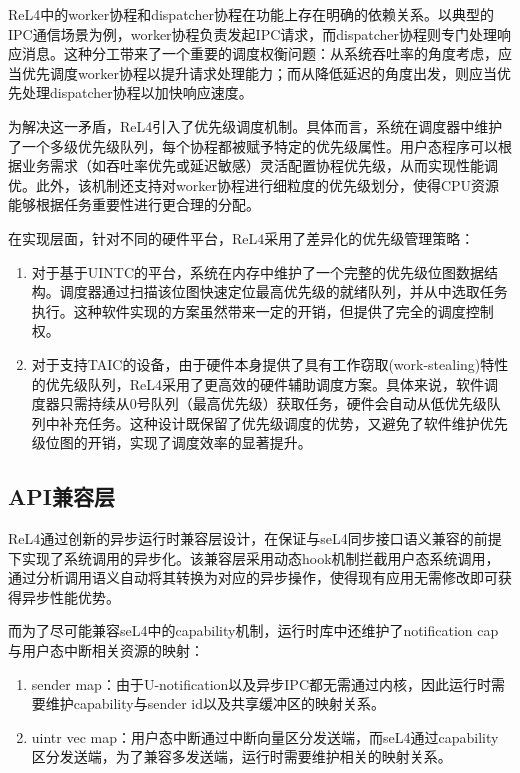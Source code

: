 ReL4中的worker协程和dispatcher协程在功能上存在明确的依赖关系。以典型的IPC通信场景为例，worker协程负责发起IPC请求，而dispatcher协程则专门处理响应消息。这种分工带来了一个重要的调度权衡问题：从系统吞吐率的角度考虑，应当优先调度worker协程以提升请求处理能力；而从降低延迟的角度出发，则应当优先处理dispatcher协程以加快响应速度。

为解决这一矛盾，ReL4引入了优先级调度机制。具体而言，系统在调度器中维护了一个多级优先级队列，每个协程都被赋予特定的优先级属性。用户态程序可以根据业务需求（如吞吐率优先或延迟敏感）灵活配置协程优先级，从而实现性能调优。此外，该机制还支持对worker协程进行细粒度的优先级划分，使得CPU资源能够根据任务重要性进行更合理的分配。

在实现层面，针对不同的硬件平台，ReL4采用了差异化的优先级管理策略：

\begin{enumerate}
  \item 对于基于UINTC的平台，系统在内存中维护了一个完整的优先级位图数据结构。调度器通过扫描该位图快速定位最高优先级的就绪队列，并从中选取任务执行。这种软件实现的方案虽然带来一定的开销，但提供了完全的调度控制权。
  \item 对于支持TAIC的设备，由于硬件本身提供了具有工作窃取(work-stealing)特性的优先级队列，ReL4采用了更高效的硬件辅助调度方案。具体来说，软件调度器只需持续从0号队列（最高优先级）获取任务，硬件会自动从低优先级队列中补充任务。这种设计既保留了优先级调度的优势，又避免了软件维护优先级位图的开销，实现了调度效率的显著提升。
\end{enumerate}


\subsection{API兼容层}

ReL4通过创新的异步运行时兼容层设计，在保证与seL4同步接口语义兼容的前提下实现了系统调用的异步化。该兼容层采用动态hook机制拦截用户态系统调用，通过分析调用语义自动将其转换为对应的异步操作，使得现有应用无需修改即可获得异步性能优势。

而为了尽可能兼容seL4中的capability机制，运行时库中还维护了notification cap与用户态中断相关资源的映射：
\begin{enumerate}
  \item sender map：由于U-notification以及异步IPC都无需通过内核，因此运行时需要维护capability与sender id以及共享缓冲区的映射关系。
  \item uintr vec map：用户态中断通过中断向量区分发送端，而seL4通过capability区分发送端，为了兼容多发送端，运行时需要维护相关的映射关系。
\end{enumerate}

